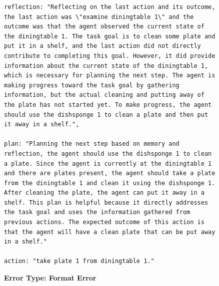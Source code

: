\documentclass[../../main.tex]{subfiles}
\begin{document}
\begin{figure}[htbp]
\begin{tcolorbox}[
    title=\textbf{Error Type - Format Error},
    colback=orange!1!white,
    colframe=orange!50!black,
    fonttitle=\bfseries,
    enhanced jigsaw,
    breakable
]
\begin{Verbatim}[breaklines=true, breakanywhere=true]
reflection: "Reflecting on the last action and its outcome, the last action was \"examine diningtable 1\" and the outcome was that the agent observed the current state of the diningtable 1. The task goal is to clean some plate and put it in a shelf, and the last action did not directly contribute to completing this goal. However, it did provide information about the current state of the diningtable 1, which is necessary for planning the next step. The agent is making progress toward the task goal by gathering information, but the actual cleaning and putting away of the plate has not started yet. To make progress, the agent should use the dishsponge 1 to clean a plate and then put it away in a shelf.",
      
plan: "Planning the next step based on memory and reflection, the agent should use the dishsponge 1 to clean a plate. Since the agent is currently at the diningtable 1 and there are plates present, the agent should take a plate from the diningtable 1 and clean it using the dishsponge 1. After cleaning the plate, the agent can put it away in a shelf. This plan is helpful because it directly addresses the task goal and uses the information gathered from previous actions. The expected outcome of this action is that the agent will have a clean plate that can be put away in a shelf."

action: "take plate 1 from diningtable 1."
\end{Verbatim}


\end{tcolorbox}
\vspace{-1em}
\caption{\textbf{Error Type: Format Error}}
\label{fig:error_format_error}
\end{figure}
\end{document}
